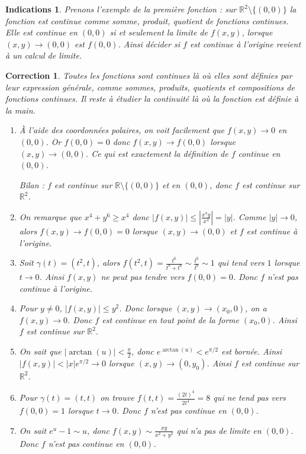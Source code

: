 \documentclass[11pt,a4paper]{article}
\newcommand{\Rr}{\mathbb{R}} \newcommand{\R}{\mathbb{R}}
\renewcommand{\ge}{\geqslant} \renewcommand{\geq}{\geqslant}
\renewcommand{\le}{\leqslant} \renewcommand{\leq}{\leqslant}
\theoremstyle{exostyle}
\newtheorem{ind}{Indications}
\newtheorem{cor}{Correction}
\newcommand{\indication}{\begin{ind}} \newcommand{\finindication}{\end{ind}}
\newcommand{\correction}{\begin{cor}} \newcommand{\fincorrection}{\end{cor}}
\begin{document}
\indication
Prenons l'exemple de la première fonction : sur $\Rr^2 \setminus \{ (0,0) \}$ la fonction est continue comme somme, produit, quotient de fonctions continues.
Elle est continue en $(0,0)$ si et seulement la limite de $f(x,y)$, lorsque $(x,y) \to (0,0)$ est $f(0,0)$. Ainsi décider si $f$ est continue à l'origine revient à un calcul de limite.
\finindication


\correction
Toutes les fonctions sont continues là où elles sont définies par leur expression générale, comme  sommes, produits, quotients et compositions de fonctions continues. Il reste à étudier la continuité là où la fonction est définie \og{}à la main\fg{}.

\begin{enumerate}	
	\item À l'aide des coordonnées polaires, on voit facilement que $f(x,y) \to 0$ en $(0,0)$.
	Or $f(0,0)=0$ donc $f(x,y) \to f(0,0)$ lorsque $(x,y) \to (0,0)$. Ce qui est exactement la définition de $f$ continue en $(0,0)$.
	
	Bilan : $f$ est continue sur $\Rr \setminus \{ (0,0) \}$ et en $(0,0)$, donc $f$ est continue sur $\Rr^2$.
	
	\item On remarque que $x^4+y^6 \ge x^4$ donc $|f(x,y)| \le \left| \frac{x^4y}{x^4} \right| = |y|$. Comme $|y| \to 0$, alors $f(x,y) \to f(0,0)=0$ lorsque $(x,y) \to (0,0)$ et $f$ est continue à l'origine.
		
	\item Soit $\gamma(t) = (t^2,t)$, alors $f(t^2,t) = \frac{t^6}{t^8+t^6} \sim \frac{t^6}{t^6} \sim 1$ qui tend vers $1$ lorsque $t \to 0$. Ainsi $f(x,y)$ ne peut pas tendre vers $f(0,0)=0$. Donc $f$ n'est pas continue à l'origine.
	
	\item Pour $y\neq 0$, $| f(x,y) | \le y^2$. Donc lorsque $(x,y) \to (x_0,0)$, on a $f(x,y) \to 0$. Donc $f$ est continue en tout point de la forme $(x_0,0)$. Ainsi $f$ est continue sur $\Rr^2$.
	
	\item On sait que $| \arctan(u) | < \frac\pi2$, donc $e^{\arctan(u)} < e^{\pi/2}$ est bornée.
	Ainsi $|f(x,y)| < |x| e^{\pi/2} \to 0$ lorsque $(x,y) \to (0,y_0)$. Ainsi $f$ est continue sur $\Rr^2$.
	
	\item Pour $\gamma(t) = (t,t)$ on trouve $f(t,t) = \frac{ (2t)^4}{2t^4} = 8$ qui ne tend pas vers $f(0,0)=1$ lorsque $t \to0$. Donc $f$ n'est pas continue en $(0,0)$.
	
	\item On sait $e^u-1 \sim u$, donc $f(x,y) \sim \frac{xy}{x^2+y^2}$ qui n'a pas de limite en $(0,0)$. Donc $f$ n'est pas continue en $(0,0)$.	
	
		
\end{enumerate}
\fincorrection
\end{document}
